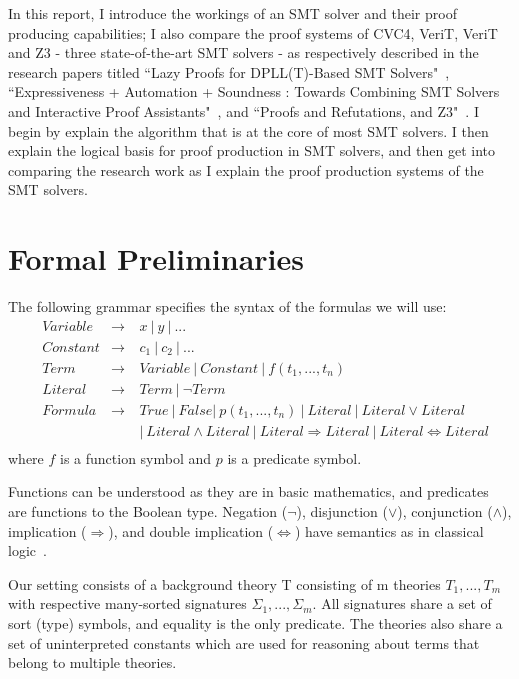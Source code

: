\documentclass{article}
\begin{document}
In this report, I introduce the workings of an SMT solver 
and their proof producing capabilities; I also compare the 
proof systems of CVC4, VeriT, VeriT and Z3 - three 
state-of-the-art SMT solvers - as respectively 
described in the research papers titled ``Lazy Proofs for 
DPLL(T)-Based SMT Solvers"~\cite{DBLP:conf/fmcad/KatzBTRH16}, 
``Expressiveness + Automation + Soundness : 
Towards Combining SMT Solvers and Interactive 
Proof Assistants"~\cite{DBLP:conf/tacas/FontaineMMNT06}, 
and ``Proofs and Refutations, and Z3"~\cite{DBLP:conf/lpar/MouraB08}.
I begin by explain the algorithm that is at the core 
of most SMT solvers. I then explain the logical basis for 
proof production in SMT solvers, and then get into 
comparing the research work as I explain the proof 
production systems of the SMT solvers.


\section{Formal Preliminaries}
\label{sec:prelim}
The following grammar specifies the syntax of the formulas we
will use: 
\begin{align*}
&Variable &\rightarrow\  &x\ |\ y\ |\ ...  \\
&Constant &\rightarrow\ &c_1\ |\ c_2\ |\ ...  \\
&Term &\rightarrow\ &Variable\ |\ Constant\ |\ f(t_1, ..., t_n) \\
&Literal &\rightarrow\ &Term\ |\ \neg Term \\
&Formula &\rightarrow\ &True\ |\ False |\ p(t_1, ..., t_n)\ 
					|\ Literal\ |\ Literal \lor Literal \\ 
& & &				|\ Literal \land Literal\ 
					|\ Literal \Rightarrow Literal\ 
					|\ Literal \iff Literal \\
\end{align*}
where $f$ is a function symbol and $p$ is a predicate symbol.

Functions can be understood as they are in basic mathematics, 
and predicates are functions to the Boolean type. Negation 
($\neg$), disjunction ($\lor$), conjunction ($\land$), 
implication ($\Rightarrow$), and double implication
($\iff$) have semantics as in classical logic~\cite{prop}.

Our setting consists of a background theory T consisting 
of m theories $T_1, ..., T_m$ with respective many-sorted 
signatures $\Sigma_1, ..., \Sigma_m$. All signatures share 
a set of sort (type) symbols, and equality is the only 
predicate. The theories also share a set of 
uninterpreted constants which are used for reasoning about 
terms that belong to multiple theories. 
\end{document}
